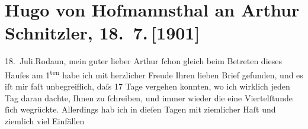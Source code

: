 

         
         \newcommand{\erwaehntePersonen}{Personen: Leopold von Andrian-Werburg, Hermann Bahr, Robert Browning, Gertrude von Hofmannsthal, Olga Schnitzler}
         \newcommand{\erwaehnteInstitutionen}{}
         \newcommand{\erwaehnteOrte}{Orte: Hofgartengasthaus, Innsbruck, Rodaun, Wien}
         \newcommand{\erwaehnteWerke}{Werke: Der Triumph der Zeit, Pompilia oder das Leben}
               \section[Hugo von Hofmannsthal an Arthur Schnitzler, 18. 7. {[}1901{]}]{ Hugo von Hofmannsthal an Arthur Schnitzler, 18. 7. {[}1901{]}}\nopagebreak{}\rehead{ }\begin{ledgroupsized}[t]{13cm}\normalsize\beginnumbering \toendnotes[C]{\smallbreak\pagebreak[2]} 
\toendnotes[C]{\smallbreak}\pstart
           \raggedleft{}{\pb}18. Juli.\hspace*{1.5em}Rodaun,\pend
           \pstart{}mein guter lieber Arthur\pend\pstart
           ſchon gleich beim Betreten dieses Hauſes am 1\textsuperscript{ten}\label{K_L01149_1v}\label{K_L01149_1h} habe ich mit herzlicher Freude Ihren lieben Brief gefunden, und es iſt mir
               faſt unbegreiflich, daſs 17 Tage vergehen konnten, wo ich wirklich jeden Tag daran
               dachte, Ihnen zu ſchreiben, und immer wieder die eine Viertelſtunde ſich wegrückte.
               Allerdings hab ich in dieſen Tagen mit ziemlicher Haſt und ziemlich viel Einfällen

\end{ledgroupsized}
